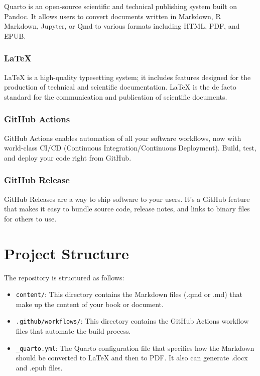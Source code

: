 \documentclass[
  letterpaper,
  paper=6in:9in,
  pagesize=pdftex,
  headinclude=on,
  footinclude=on,
  12pt]{scrbook}
\providecommand{\tightlist}{%
  \setlength{\itemsep}{0pt}\setlength{\parskip}{0pt}}\usepackage{longtable,booktabs,array}
\begin{document}
Quarto is an open-source scientific and technical publishing system
built on Pandoc. It allows users to convert documents written in
Markdown, R Markdown, Jupyter, or Qmd to various formats including HTML,
PDF, and EPUB.

\subsection{LaTeX}\label{latex}

LaTeX is a high-quality typesetting system; it includes features
designed for the production of technical and scientific documentation.
LaTeX is the de facto standard for the communication and publication of
scientific documents.

\subsection{GitHub Actions}\label{github-actions}

GitHub Actions enables automation of all your software workflows, now
with world-class CI/CD (Continuous Integration/Continuous Deployment).
Build, test, and deploy your code right from GitHub.

\subsection{GitHub Release}\label{github-release}

GitHub Releases are a way to ship software to your users. It's a GitHub
feature that makes it easy to bundle source code, release notes, and
links to binary files for others to use.


\chapter{Project Structure}\label{project-structure}

The repository is structured as follows:

\begin{itemize}
\tightlist
\item
  \texttt{content/}: This directory contains the Markdown files (.qmd or
  .md) that make up the content of your book or document.
\item
  \texttt{.github/workflows/}: This directory contains the GitHub
  Actions workflow files that automate the build process.
\item
  \texttt{\_quarto.yml}: The Quarto configuration file that specifies
  how the Markdown should be converted to LaTeX and then to PDF. It also
  can generate .docx and .epub files.
\end{itemize}
\end{document}
